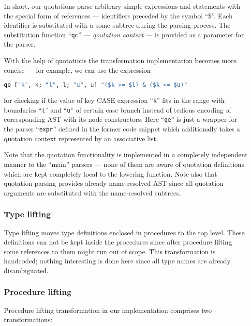 In short, our quotations parse arbitrary simple expressions and statements with the special form of
references --- identifiers preceded by the symbol ``\$''. Each identifier is substituted with a
some subtree during the parsing process. The substitution function ``\lstinline{qc}'' --- 
\emph{qoutation context} --- is provided as a parameter for the parser. 

With the help of quotations the transformation implementation becomes more concise --- for example, 
we can use the expression

\begin{lstlisting}[language=ocaml]
   qe ["k", k; "l", l; "u", u] "($k >= $l) & ($k <= $u)"
\end{lstlisting}

for checking if the value of key CASE expression ``\lstinline{k}'' fits in the range with boundaries
``\lstinline{l}'' and ``\lstinline{u}'' of certain case branch instead of tedious encoding of corresponding 
AST with its node constructors. Here ``\lstinline{qe}'' is just a wrapper for the parser ``\lstinline{expr}''
defined in the former code snippet which additionally takes a quotation context represented by an associative 
list.

Note that the quotation functionality is implemented in a completely independent manner to the ``main'' parsers ---
none of them are aware of quotation definitions which are kept completely local to the lowering function. Note also
that quotation parsing provides already name-resolved AST since all quotation arguments are substituted with 
the name-resolved subtrees.

\subsubsection{Type lifting}

Type lifting moves type definitions enclosed in procedures to the top level. These definitions can not be
kept inside the procedures since after procedure lifting some references to them might run out
of scope. This transformation is handcoded; nothing interesting is done here since all type names are 
already disambiguated.

\subsubsection{Procedure lifting}

Procedure lifting transformation in our implementation comprises two transformations:

